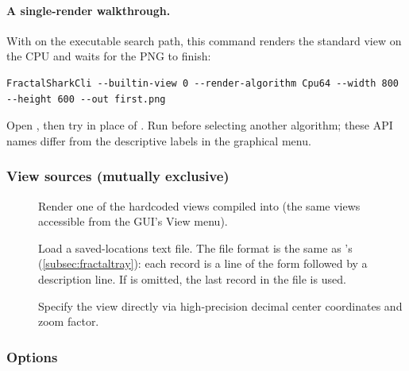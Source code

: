 \paragraph{A single-render walkthrough.}
With  on the executable search path, this command renders the
standard view on the CPU and waits for the PNG to finish:
\begin{lstlisting}[language={},upquote=true]
FractalSharkCli --builtin-view 0 --render-algorithm Cpu64 --width 800 --height 600 --out first.png
\end{lstlisting}
Open , then try  in place of . Run
 before selecting another algorithm; these
API names differ from the descriptive labels in the graphical menu.

\subsubsection*{View sources (mutually exclusive)}

\begin{description}
  \item[]
    Render one of the hardcoded views compiled into \FractalShark{}
    (the same views accessible from the GUI's View menu).

  \item[]
    Load a saved-locations text file.  The file format is the same as
    's (\cref{subsec:fractaltray}): each record is a
    line of the form
    followed by a description line.  If  is
    omitted, the last record in the file is used.

  \item[]
    Specify the view directly via high-precision decimal center
    coordinates and zoom factor.
\end{description}

\subsubsection*{Options}

